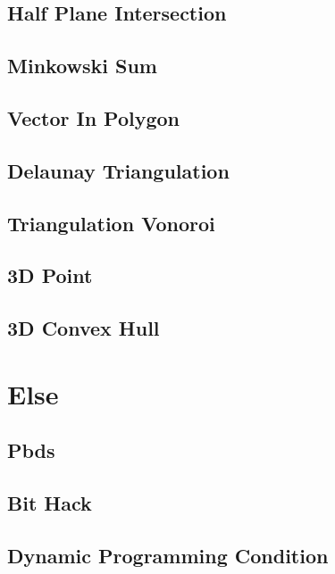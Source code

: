 \subsection{Half Plane Intersection}
\subsection{Minkowski Sum}
\subsection{Vector In Polygon}
\subsection{Delaunay Triangulation}
\subsection{Triangulation Vonoroi}
\subsection{3D Point}

\subsection{3D Convex Hull}


\section{Else}
\subsection{Pbds}

\subsection{Bit Hack}

\subsection{Dynamic Programming Condition}

